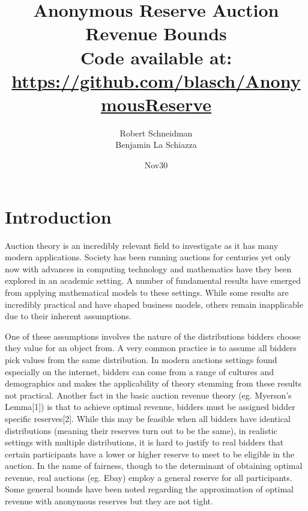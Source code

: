\documentclass{acm_proc_article-sp}
\begin{document}
\title{Anonymous Reserve Auction Revenue Bounds \\
{\normalsize Code available at: \url{https://github.com/blasch/AnonymousReserve}}} 
\subtitle{}

\author{
\alignauthor 
Robert Schneidman \\
\alignauthor Benjamin La Schiazza\\
}

\date{Nov30}

\maketitle
\begin{abstract}

\end{abstract}

\section{Introduction}
Auction theory is an incredibly relevant field to investigate as it has many modern applications. Society has been running auctions for centuries yet only now with advances in computing technology and mathematics have they been explored in an academic setting. A number of fundamental results have emerged from applying mathematical models to these settings. While some results are incredibly practical and have shaped business models, others remain inapplicable due to their inherent assumptions. 

One of these assumptions involves the nature of the distributions bidders choose they value for an object from. A very common practice is to assume all bidders pick values from the same distribution. In modern auctions settings found especially on the internet, bidders can come from a range of cultures and demographics and makes the applicability of theory stemming from these results not practical. Another fact in the basic auction revenue theory (eg. Myerson's Lemma[1]) is that to achieve optimal revenue, bidders must be assigned bidder specific reserves[2]. While this may be feasible when all bidders have identical distributions (meaning their reserves turn out to be the same), in realistic settings with multiple distributions, it is hard to justify to real bidders that certain participants have a lower or higher reserve to meet to be eligible in the auction. In the name of fairness, though to the determinant of obtaining optimal revenue, real auctions (eg. Ebay) employ a general reserve for all participants. Some general bounds have been noted regarding the approximation of optimal revenue with anonymous reserves but they are not tight\cite[p. 126]{hartline}. 
\end{document}
